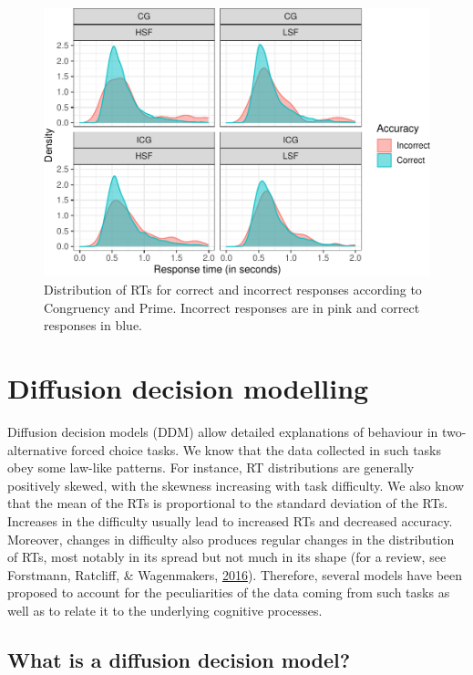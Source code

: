 \documentclass[
  11pt,
  english,
  ,doc,floatsintext]{apa6}
\begin{document}
\begin{figure}[!htb]

{\centering \includegraphics[width=0.75\linewidth]{supplementary_materials_files/figure-latex/correctness2-1} 

}

\caption{Distribution of RTs for correct and incorrect responses according to Congruency and Prime. Incorrect responses are in pink and correct responses in blue.}\label{fig:correctness2}
\end{figure}

\newpage

\hypertarget{diffusion-decision-modelling}{%
\section{Diffusion decision modelling}\label{diffusion-decision-modelling}}

Diffusion decision models (DDM) allow detailed explanations of behaviour in two-alternative forced choice tasks. We know that the data collected in such tasks obey some law-like patterns. For instance, RT distributions are generally positively skewed, with the skewness increasing with task difficulty. We also know that the mean of the RTs is proportional to the standard deviation of the RTs. Increases in the difficulty usually lead to increased RTs and decreased accuracy. Moreover, changes in difficulty also produces regular changes in the distribution of RTs, most notably in its spread but not much in its shape (for a review, see Forstmann, Ratcliff, \& Wagenmakers, \protect\hyperlink{ref-forstmann_sequential_2016}{2016}). Therefore, several models have been proposed to account for the peculiarities of the data coming from such tasks as well as to relate it to the underlying cognitive processes.

\hypertarget{what-is-a-diffusion-decision-model}{%
\subsection{What is a diffusion decision model?}\label{what-is-a-diffusion-decision-model}}
\end{document}
